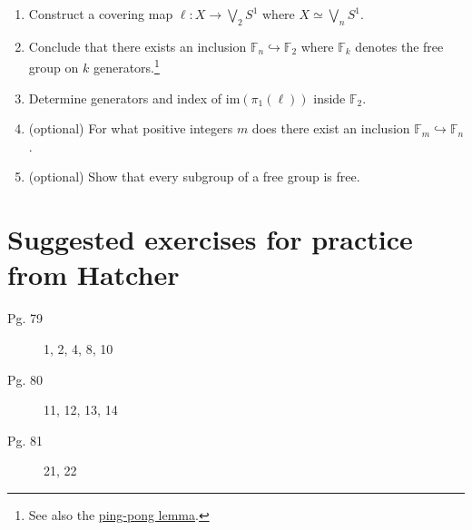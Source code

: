\documentclass{article}
\begin{document}
\begin{enumerate}
\begin{enumerate}
  \item Construct a covering map $\ell: X \to \bigvee _2 S^1$ where $X \simeq \bigvee _n S^1$.
  \item Conclude that there exists an
    inclusion $\mathbb{F}_n \hookrightarrow \mathbb{F}_2$ where $\mathbb{F}_k$ denotes the
    free group on $k$ generators.\footnote{See
      also the \href{https://en.wikipedia.org/wiki/Ping-pong_lemma}{ping-pong lemma}.}
  \item Determine generators and index of $\mathrm{im}(\pi_1(\ell))$ inside
    $\mathbb{F}_2$.
  \item (optional) For what positive integers $m$ does there exist an inclusion
    $\mathbb{F}_m \hookrightarrow \mathbb{F}_n$.
  \item (optional) Show that every subgroup of a free group is free.  \end{enumerate}
\end{enumerate}

\newpage
\section*{Suggested exercises for practice from Hatcher}

\begin{description}
\item[Pg. 79] 1, 2, 4, 8, 10
\item[Pg. 80] 11, 12, 13, 14
\item[Pg. 81] 21, 22
\end{description}
\end{document}

